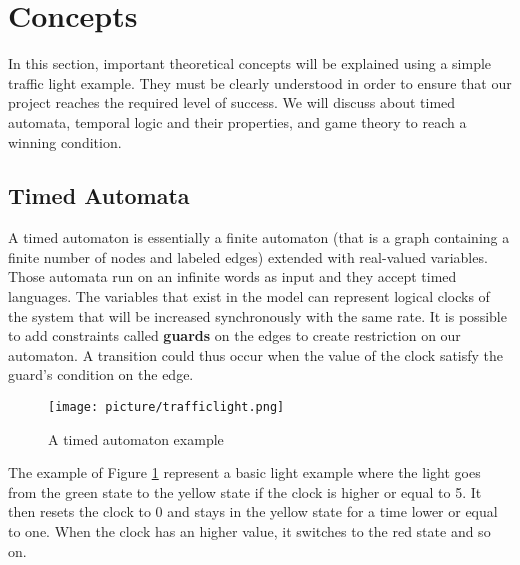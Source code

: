 \section{Concepts}
In this section, important theoretical concepts will be explained using a simple traffic light example. They must be clearly understood in order to ensure that our project reaches the required level of success. We will discuss about timed automata, temporal logic and their properties, and game theory to reach a winning condition.

\subsection{Timed Automata} \label{sec:automate}
A timed automaton is essentially a finite automaton (that is a graph
containing a finite number of nodes and labeled edges) extended with real-valued variables. Those automata run on an infinite words as input and they accept timed languages. The variables that exist in the model can represent logical clocks of the system that will be increased synchronously with the same rate.
It is possible to add constraints called \textbf{guards} on the edges to create restriction on our automaton. A transition could thus occur when the value of the clock satisfy the guard's condition on the edge.

\begin{figure}[H]\label{fig:timed}
  \centering
    \texttt{[image: picture/trafficlight.png]}
    \caption{A timed automaton example}
\end{figure}

The example of Figure \ref{fig:timed} represent a basic light example where the light goes from the green state to the yellow state if the clock is higher or equal to 5. It then resets the clock to 0 and stays in the yellow state for a time lower or equal to one. When the clock has an higher value, it switches to the red state and so on.

